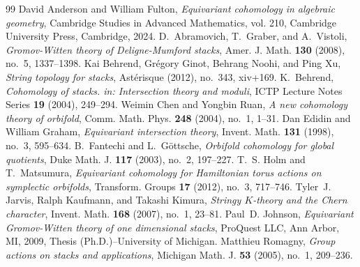\documentclass[10pt,a4paper]{amsart}
\newcommand{\1}{\mathds{1}}   %
\begin{document}
\begin{thebibliography}{99}
 David Anderson and William Fulton, \emph{Equivariant cohomology in algebraic geometry}, Cambridge Studies in Advanced Mathematics, vol. 210, Cambridge University Press, Cambridge, 2024. 
 D.~Abramovich, T.~Graber, and A.~Vistoli, \emph{Gromov-{W}itten theory of {D}eligne-{M}umford stacks}, Amer. J. Math. \textbf{130} (2008), no.~5, 1337--1398.
 Kai Behrend, Gr\'egory Ginot, Behrang Noohi, and Ping Xu, \emph{String topology for stacks}, Ast\'erisque (2012), no.~343, xiv+169. 
 K.~Behrend, \emph{Cohomology of stacks. in: Intersection theory and moduli}, ICTP Lecture Notes Series \textbf{19} (2004), 249--294.
 Weimin Chen and Yongbin Ruan, \emph{A new cohomology theory of orbifold}, Comm. Math. Phys. \textbf{248} (2004), no.~1, 1--31. 
 Dan Edidin and William Graham, \emph{Equivariant intersection theory}, Invent. Math. \textbf{131} (1998), no.~3, 595--634. 
 B.~Fantechi and L.~G\"{o}ttsche, \emph{Orbifold cohomology for global quotients}, Duke Math. J. \textbf{117} (2003), no.~2, 197--227.
 T.~S. Holm and T.~Matsumura, \emph{Equivariant cohomology for {H}amiltonian torus actions on symplectic orbifolds}, Transform. Groups \textbf{17} (2012), no.~3, 717--746. 
 Tyler~J. Jarvis, Ralph Kaufmann, and Takashi Kimura, \emph{Stringy {$K$}-theory and the {C}hern character}, Invent. Math. \textbf{168} (2007), no.~1, 23--81. 
 Paul~D. Johnson, \emph{Equivariant {G}romov-{W}itten theory of one dimensional stacks}, ProQuest LLC, Ann Arbor, MI, 2009, Thesis (Ph.D.)--University of Michigan. 
 Matthieu Romagny, \emph{Group actions on stacks and applications}, Michigan Math. J. \textbf{53} (2005), no.~1, 209--236.
\end{thebibliography}
\end{document}
